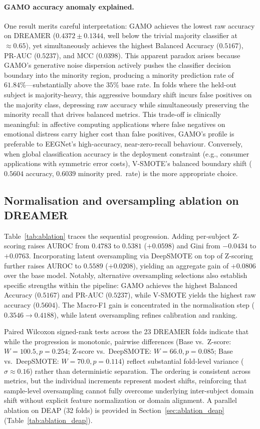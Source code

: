 \documentclass[a4paper,fleqn]{cas-sc}
\begin{document}
\paragraph{GAMO accuracy anomaly explained.}
One result merits careful interpretation: GAMO achieves the lowest raw accuracy on DREAMER ($0.4372\pm0.1344$, well below the trivial majority classifier at $\approx0.65$), yet simultaneously achieves the highest Balanced Accuracy ($0.5167$), PR-AUC ($0.5237$), and MCC ($0.0398$). This apparent paradox arises because GAMO's generative noise dispersion actively pushes the classifier decision boundary into the minority region, producing a minority prediction rate of $61.84\%$---substantially above the $35\%$ base rate. In folds where the held-out subject is majority-heavy, this aggressive boundary shift incurs false positives on the majority class, depressing raw accuracy while simultaneously preserving the minority recall that drives balanced metrics. This trade-off is clinically meaningful: in affective computing applications where false negatives on emotional distress carry higher cost than false positives, GAMO's profile is preferable to EEGNet's high-accuracy, near-zero-recall behaviour. Conversely, when global classification accuracy is the deployment constraint (e.g., consumer applications with symmetric error costs), V-SMOTE's balanced boundary shift ($0.5604$ accuracy, $0.6039$ minority pred.\  rate) is the more appropriate choice.

\subsection{Normalisation and oversampling ablation on DREAMER}
Table~\ref{tab:ablation} traces the sequential progression. Adding per-subject Z-scoring raises AUROC from $0.4783$ to $0.5381$ ($+0.0598$) and Gini from $-0.0434$ to $+0.0763$. Incorporating latent oversampling via DeepSMOTE on top of Z-scoring further raises AUROC to $0.5589$ ($+0.0208$), yielding an aggregate gain of $+0.0806$ over the base model. Notably, alternative oversampling selections also establish specific strengths within the pipeline: GAMO achieves the highest Balanced Accuracy ($0.5167$) and PR-AUC ($0.5237$), while V-SMOTE yields the highest raw accuracy ($0.5604$). The Macro-F1 gain is concentrated in the normalisation step ($0.3546\to0.4188$), while latent oversampling refines calibration and ranking. 

Paired Wilcoxon signed-rank tests across the 23 DREAMER folds indicate that while the progression is monotonic, pairwise differences (Base vs.\ Z-score: $W=100.5, p=0.254$; Z-score vs.\ DeepSMOTE: $W=66.0, p=0.085$; Base vs.\ DeepSMOTE: $W=70.0, p=0.114$) reflect substantial fold-level variance ($\sigma\approx0.16$) rather than deterministic separation. The ordering is consistent across metrics, but the individual increments represent modest shifts, reinforcing that sample-level oversampling cannot fully overcome underlying inter-subject domain shift without explicit feature normalization or domain alignment. A parallel ablation on DEAP (32 folds) is provided in Section~\ref{sec:ablation_deap} (Table~\ref{tab:ablation_deap}).
\end{document}
